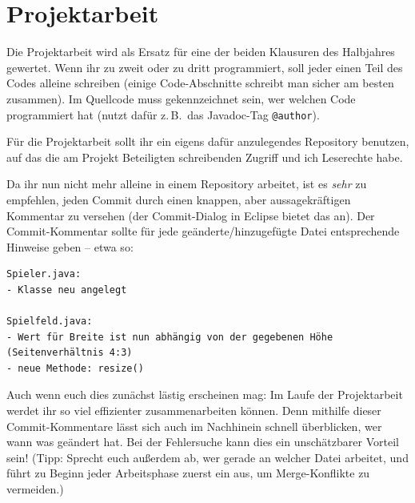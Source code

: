 \chapter{Projektarbeit \tagZusatz \tagLK}
\renewcommand{\chaptertitle}{Projektarbeit}

\lehead[]{\normalfont\sffamily\hspace*{-2.00cm}\textcolor{white}{\colorbox{lightblue}{\makebox[1.60cm][r]{\thechapter}}}\hspace{0.17cm}\textcolor{lightblue}{\chaptertitle}}
\rohead[]{\textcolor{lightblue}{\chaptertitle}\normalfont\sffamily\hspace*{0.17cm}\textcolor{white}{\colorbox{lightblue}{\makebox[1.60cm][l]{\thechapter}}}\hspace{-2.00cm}}
\rehead[]{\textcolor{lightblue}{AvHG, Inf, My}}
\lohead[]{\textcolor{lightblue}{AvHG, Inf, My}}

\lstset{style=myJava}

Die Projektarbeit wird als Ersatz für eine der beiden Klausuren des Halbjahres
gewertet. Wenn ihr zu zweit oder zu dritt programmiert, soll jeder einen Teil
des Codes alleine schreiben (einige Code-Abschnitte schreibt man sicher am
besten zusammen). Im Quellcode muss gekennzeichnet sein, wer welchen Code
programmiert hat (nutzt dafür z.\,B.\ das Javadoc-Tag \lstinline|@author|).

Für die Projektarbeit sollt ihr ein eigens dafür anzulegendes Repository
benutzen, auf das die am Projekt Beteiligten schreibenden Zugriff und ich
Leserechte habe.

Da ihr nun nicht mehr alleine in einem Repository arbeitet, ist es \emph{sehr}
zu empfehlen, jeden Commit durch einen knappen, aber aussagekräftigen Kommentar
zu versehen (der Commit-Dialog in Eclipse bietet das an). Der Commit-Kommentar
sollte für jede geänderte/hinzugefügte Datei entsprechende Hinweise geben --
etwa so:

\begin{lstlisting}
Spieler.java:
- Klasse neu angelegt

Spielfeld.java: 
- Wert für Breite ist nun abhängig von der gegebenen Höhe (Seitenverhältnis 4:3)
- neue Methode: resize()
\end{lstlisting}

Auch wenn euch dies zunächst lästig erscheinen mag: Im Laufe der Projektarbeit
werdet ihr so viel effizienter zusammenarbeiten können. Denn mithilfe dieser
Commit-Kommentare lässt sich auch im Nachhinein schnell überblicken, wer wann
was geändert hat. Bei der Fehlersuche kann dies ein unschätzbarer Vorteil sein!
(Tipp: Sprecht euch außerdem ab, wer gerade an welcher Datei arbeitet, und führt
zu Beginn jeder Arbeitsphase zuerst ein  aus, um Merge-Konflikte zu
vermeiden.)


